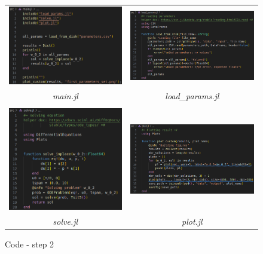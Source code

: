 \documentclass[11pt]{article}
\begin{document}
					\begin{figure}[h!]
							\centering
							\caption{Code - step 2}
							\label{fig:step2_code}

							\begin{tabular}{cc}
								\includegraphics[width=7.5cm]{figures/diff_equation/code_main_step_2.png}
								&
								\includegraphics[width=7.5cm]{figures/diff_equation/code_load_params_step_2} \\
								\textit{main.jl}
								&
								\textit{load\_params.jl} \\
								\\
								\includegraphics[width=7.5cm]{figures/diff_equation/code_solve_step_2}
								&
								\includegraphics[width=7.5cm]{figures/diff_equation/code_plot_step_2} \\
								\textit{solve.jl}
								&
								\textit{plot.jl} \\
							\end{tabular}
					\end{figure}
\end{document}

